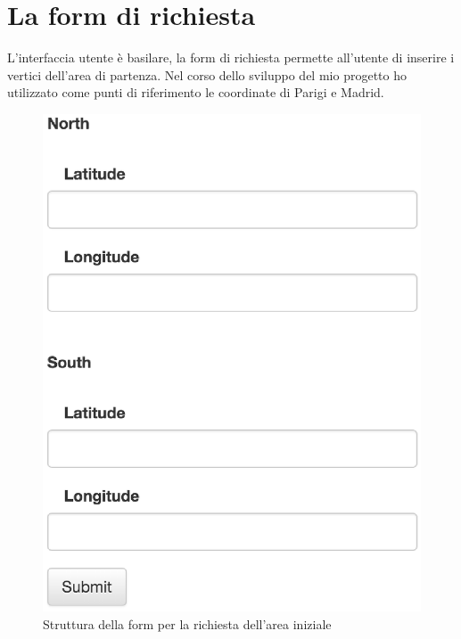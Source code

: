 \section{La form di richiesta}
L'interfaccia utente è basilare, la form di richiesta permette all'utente di inserire i vertici dell'area di partenza. Nel corso dello sviluppo del mio progetto ho utilizzato come punti di riferimento le coordinate di Parigi e Madrid.

\begin{figure}[H]
	\centering
	\includegraphics[scale=0.5]{figure/formexample.eps}
	\caption{Struttura della form per la richiesta dell'area iniziale}
\end{figure}

